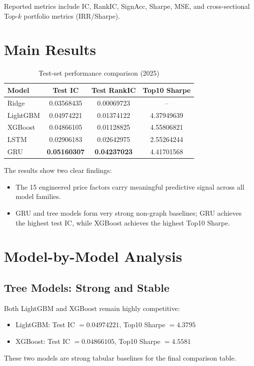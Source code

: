 Reported metrics include IC, RankIC, SignAcc, Sharpe, MSE, and cross-sectional Top-$k$ portfolio metrics (IRR/Sharpe).

\section{Main Results}

\begin{table}[htbp]
\centering
\caption{Test-set performance comparison (2025)}
\label{tab:main-test-results}
\begin{tabular}{lccc}
\hline
Model & Test IC & Test RankIC & Top10 Sharpe \\
\hline
Ridge & 0.03568435 & 0.00069723 & -- \\
LightGBM & 0.04974221 & 0.01374122 & 4.37949639 \\
XGBoost & 0.04866105 & 0.01128825 & 4.55806821 \\
LSTM & 0.02906183 & 0.02642975 & 2.55264244 \\
GRU & \textbf{0.05160307} & \textbf{0.04237023} & 4.41701568 \\
\hline
\end{tabular}
\end{table}

The results show two clear findings:
\begin{itemize}
	\item The 15 engineered price factors carry meaningful predictive signal across all model families.
	\item GRU and tree models form very strong non-graph baselines; GRU achieves the highest test IC, while XGBoost achieves the highest Top10 Sharpe.
\end{itemize}

\section{Model-by-Model Analysis}

\subsection{Tree Models: Strong and Stable}
Both LightGBM and XGBoost remain highly competitive:
\begin{itemize}
	\item LightGBM: Test IC $=0.04974221$, Top10 Sharpe $=4.3795$
	\item XGBoost: Test IC $=0.04866105$, Top10 Sharpe $=4.5581$
\end{itemize}
These two models are strong tabular baselines for the final comparison table.

